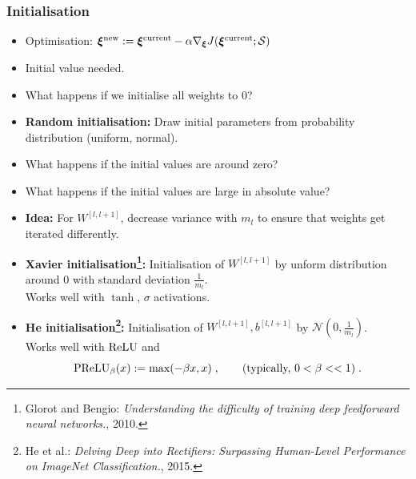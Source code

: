 \documentclass[10pt,hyperref={pdfpagelabels=false}]{beamer}
\begin{document}
\begin{frame}[allowframebreaks]
    \frametitle{Initialisation}
    \begin{itemize}
        \item Optimisation: $
            \boldsymbol{\xi}^{\text{new}} := \boldsymbol{\xi}^{\text{current}}
            - \alpha \nabla_{\boldsymbol{\xi}}J(\boldsymbol{\xi}^{\text{current}};\mathcal{S})$
        \item Initial value needed.
        \item What happens if we initialise all weights to $0$?\\

        
        \framebreak
        \item {\bf Random initialisation:} Draw initial parameters from probability distribution (uniform, normal).
        \item What happens if the initial values are around zero?
        \item What happens if the initial values are large in absolute value?
        \item {\bf Idea:} For $W^{[l, l+1]}$, decrease variance with $m_l$ to ensure that weights get iterated differently.
        \item {\bf Xavier initialisation\footnote{Glorot and Bengio: \emph{Understanding the difficulty of training deep feedforward neural networks.}, 2010.}:} Initialisation of $W^{[l, l+1]}$ by unform distribution around $0$ with standard deviation $\frac{1}{m_{l}}$.\\[.5em]
        Works well with $\tanh$, $\sigma$ activations.
        \item {\bf He initialisation\footnote{He et al.: \emph{Delving Deep into Rectifiers: Surpassing Human-Level Performance on ImageNet Classification.}, 2015.}:} Initialisation of $W^{[l, l+1]}, b^{[l, l+1]}$ by $\mathcal{N}\left(0, \frac{1}{m_{l}}\right)$.\\
        Works well with $\operatorname{ReLU}$ and
        $$
            \operatorname{PReLU}_{\beta}(x):=\max(-\beta x, x)
            \;,\qquad
            \text{(typically, $0<\beta<<1$)}
            \;.
        $$
    \end{itemize}
\end{frame}
\end{document}
